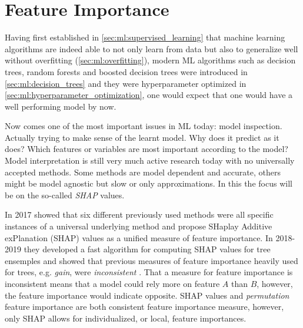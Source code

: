\documentclass[a4paper, twoside, nobib]{tufte-book}
\newcommand{\autocite}[1]{\citep{#1}}
\begin{document}
\section{Feature Importance}
\label{sec:ml:feature_importance}
Having first established in \autoref{sec:ml:supervised_learning} that machine learning algorithms are indeed able to not only learn from data but also to generalize well without overfitting (\autoref{sec:ml:overfitting}), modern ML algorithms such as decision trees, random forests and boosted decision trees were introduced in \autoref{sec:ml:decision_trees} and they were hyperparameter optimized in \autoref{sec:ml:hyperparameter_optimization}, one would expect that one would have a well performing model by now. 

Now comes one of the most important issues in ML today: model inspection. Actually trying to make sense of the learnt model. Why does it predict as it does? Which features or variables are most important according to the model? Model interpretation is still very much active research today with no universally accepted methods. Some methods are model dependent and accurate, others might be model agnostic but slow or only approximations. In this the focus will be on the so-called \emph{SHAP} values. 

In 2017 \citet{Lundberg:2017} showed that six different previously used methods were all specific instances of a universal underlying method and propose SHaplay Additive exPlanation (SHAP) values as a unified measure of feature importance. In 2018-2019 they developed a fast algorithm for computing SHAP values for tree ensemples and showed that previous measures of feature importance heavily used for trees, e.g. \emph{gain}, were \emph{inconsistent} \autocite{lundbergConsistentIndividualizedFeature2019}. That a measure for feature importance is inconsistent means that a model could rely more on feature $A$ than $B$, however, the feature importance would indicate opposite. SHAP values and \emph{permutation} feature importance are both consistent feature importance measure, however, only SHAP allows for individualized, or local, feature importances.  
\end{document}
